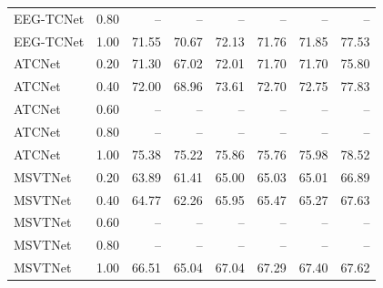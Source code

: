 \begin{table}[!t]
{\begin{tabular}{l c r r r r r r}
EEG-TCNet & 0.80 & -- & -- & -- & -- & -- & -- \\
EEG-TCNet & 1.00 & 71.55 & 70.67 & 72.13 & 71.76 & 71.85 & 77.53 \\
\addlinespace
ATCNet & 0.20 & 71.30 & 67.02 & 72.01 & 71.70 & 71.70 & 75.80 \\
ATCNet & 0.40 & 72.00 & 68.96 & 73.61 & 72.70 & 72.75 & 77.83 \\
ATCNet & 0.60 & -- & -- & -- & -- & -- & -- \\
ATCNet & 0.80 & -- & -- & -- & -- & -- & -- \\
ATCNet & 1.00 & 75.38 & 75.22 & 75.86 & 75.76 & 75.98 & 78.52 \\
\addlinespace
MSVTNet & 0.20 & 63.89 & 61.41 & 65.00 & 65.03 & 65.01 & 66.89 \\
MSVTNet & 0.40 & 64.77 & 62.26 & 65.95 & 65.47 & 65.27 & 67.63 \\
MSVTNet & 0.60 & -- & -- & -- & -- & -- & -- \\
MSVTNet & 0.80 & -- & -- & -- & -- & -- & -- \\
MSVTNet & 1.00 & 66.51 & 65.04 & 67.04 & 67.29 & 67.40 & 67.62 \\
\bottomrule
\end{tabular}
}
\end{table}

